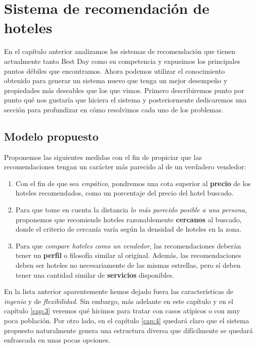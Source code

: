 \documentclass[12pt]{report}
\begin{document}
\chapter{Sistema de recomendación de hoteles} \label{cap:2}

En el capítulo anterior analizamos los sistemas de recomendación que tienen actualmente tanto Best Day como su competencia y expusimos los principales puntos débiles que encontramos. Ahora podemos utilizar el conocimiento obtenido para generar un sistema nuevo que tenga un mejor desempeño y propiedades más deseables que los que vimos. Primero describiremos punto por punto qué nos gustaría que hiciera el sistema y posteriormente dedicaremos una sección para profundizar en cómo resolvimos cada uno de los problemas.

\section{Modelo propuesto}

Proponemos las siguientes medidas con el fin de propiciar que las recomendaciones tengan un carácter más parecido al de un verdadero vendedor:
\begin{enumerate}
	\item Con el fin de que sea \emph{empático}, pondremos una cota superior al \textbf{precio} de los hoteles recomendados, como un porcentaje del precio del hotel buscado.
	\item Para que tome en cuenta la distancia \emph{lo más parecido posible a una persona}, proponemos que recomiende hoteles razonablemente \textbf{cercanos} al buscado, donde el criterio de cercanía varía según la densidad de hoteles en la zona.
	\item Para que \emph{compare hoteles como un vendedor}, las recomendaciones deberán tener un \textbf{perfil} o filosofía similar al original. Además, las recomendaciones deben ser hoteles no necesariamente de las mismas estrellas, pero sí deben tener una cantidad similar de \textbf{servicios} disponibles.
\end{enumerate}
En la lista anterior aparentemente hemos dejado fuera las características de \emph{ingenio} y de \emph{flexibilidad}. Sin embargo, más adelante en este capítulo y en el capítulo \ref{cap:3} veremos qué hicimos para tratar con casos atípicos o con muy poca población. Por otro lado, en el capítulo \ref{cap:4} quedará claro que el sistema propuesto naturalmente genera una estructura diversa que difícilmente se quedará enfrascada en unas pocas opciones.
\end{document}
